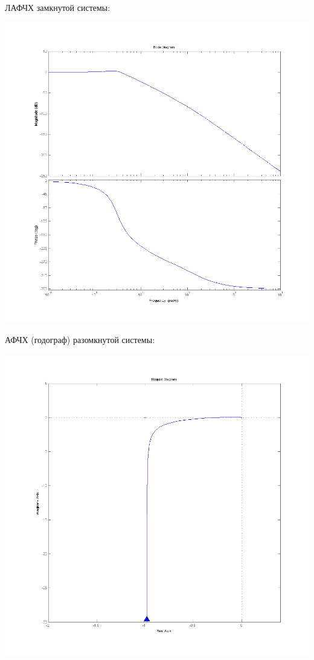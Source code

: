 \documentclass[a4paper,12pt]{article}
\renewcommand{\^}[2]{#1^{\, #2} \kern -1pt}
\newcommand{\1}{\kern 1pt}
\newcommand{\0}{\kern -1pt}
\begin{document}
	ЛАФЧХ замкнутой системы:

	\begin{center}
		\includegraphics[scale=0.7,page=1]{3_зад/bode_замкнутой}
	\end{center}
	
	\newpage
	
	АФЧХ (годограф) разомкнутой системы:

	\begin{center}
		\includegraphics[scale=0.7,page=1]{3_зад/nyquist_разомкнутой(2)}
	\end{center}
\end{document}

